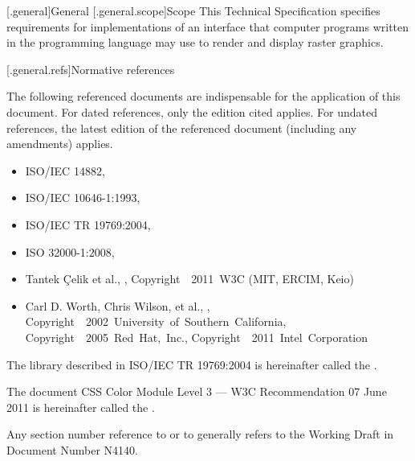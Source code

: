 [\iotwod.general]{General}
[\iotwod.general.scope]{Scope}
\pnum
{}%
This Technical Specification specifies requirements for implementations
of an interface that computer programs written in the \Cpp programming
language may use to render and display raster graphics.%

[\iotwod.general.refs]{Normative references}

\pnum
{}%
The following referenced documents are indispensable for the application
of this document. For dated references, only the edition cited applies.
For undated references, the latest edition of the referenced document
(including any amendments) applies.

\begin{itemize}
\item ISO/IEC 14882, 
\item ISO/IEC 10646-1:1993, 
\item ISO/IEC TR 19769:2004, 
\item ISO 32000-1:2008, 
\item Tantek \c{C}elik et al., , 
Copyright~\textcopyright~2011~W3C\textsuperscript{\textregistered} (MIT, ERCIM, 
Keio)
\item Carl D. Worth, Chris Wilson, et al., , 
Copyright~\textcopyright~2002~University~of~Southern~California, 
Copyright~\textcopyright~2005~Red~Hat,~Inc., 
Copyright~\textcopyright~2011~Intel~Corporation
\end{itemize}

\pnum
The library described in ISO/IEC TR 19769:2004 is hereinafter called the
.

\pnum
The document CSS Color Module Level 3 --- W3C Recommendation 07 June 2011 is 
hereinafter called the .

\pnum
Any section number reference to \CppXIV or to \Cpp generally refers to the 
Working Draft in Document Number N4140.

